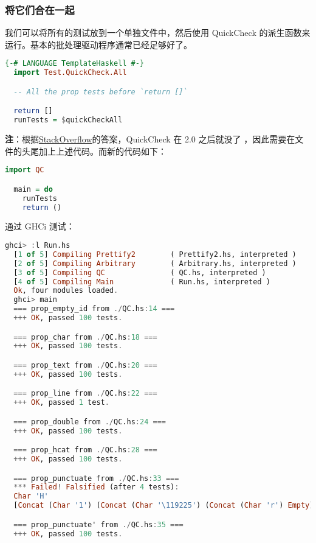 \documentclass[./main.tex]{subfiles}
\begin{document}
\subsubsection*{将它们合在一起}

我们可以将所有的测试放到一个单独文件中，然后使用 QuickCheck 的派生函数来运行。基本的批处理驱动程序通常已经足够好了。

\begin{lstlisting}[language=Haskell]
  {-# LANGUAGE TemplateHaskell #-}
  import Test.QuickCheck.All

  -- All the prop tests before `return []`

  return []
  runTests = $quickCheckAll
\end{lstlisting}

\textbf{注}：根据\href{https://stackoverflow.com/a/42669557/22544285}{StackOverflow}的答案，QuickCheck 在 2.0 之后就没了
，因此需要在文件的头尾加上上述代码。而新的代码如下：

\begin{lstlisting}[language=Haskell]
  import QC

  main = do
    runTests
    return ()
\end{lstlisting}

通过 GHCi 测试：

\begin{lstlisting}[language=Haskell]
  ghci> :l Run.hs
  [1 of 5] Compiling Prettify2        ( Prettify2.hs, interpreted )
  [2 of 5] Compiling Arbitrary        ( Arbitrary.hs, interpreted )
  [3 of 5] Compiling QC               ( QC.hs, interpreted )
  [4 of 5] Compiling Main             ( Run.hs, interpreted )
  Ok, four modules loaded.
  ghci> main
  === prop_empty_id from ./QC.hs:14 ===
  +++ OK, passed 100 tests.

  === prop_char from ./QC.hs:18 ===
  +++ OK, passed 100 tests.

  === prop_text from ./QC.hs:20 ===
  +++ OK, passed 100 tests.

  === prop_line from ./QC.hs:22 ===
  +++ OK, passed 1 test.

  === prop_double from ./QC.hs:24 ===
  +++ OK, passed 100 tests.

  === prop_hcat from ./QC.hs:28 ===
  +++ OK, passed 100 tests.

  === prop_punctuate from ./QC.hs:33 ===
  *** Failed! Falsified (after 4 tests):
  Char 'H'
  [Concat (Char '1') (Concat (Char '\119225') (Concat (Char 'r') Empty)),Text ""]

  === prop_punctuate' from ./QC.hs:35 ===
  +++ OK, passed 100 tests.
\end{lstlisting}
\end{document}

